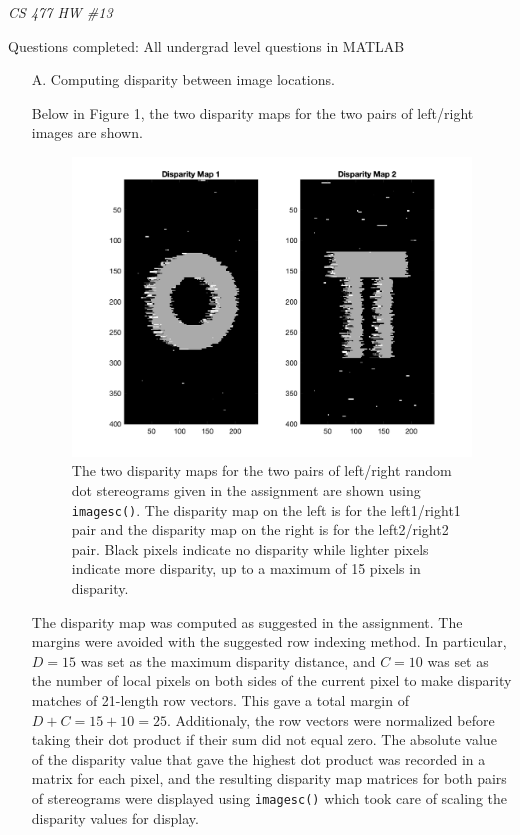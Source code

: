 \documentclass[12pt]{report}
\begin{document}
\centerline{\it CS 477 HW \#13}
\centerline{Questions completed: All undergrad level questions in MATLAB}

\begin{enumerate}

\item[A.] Computing disparity between image locations.

  Below in Figure 1, the two disparity maps for the two pairs of left/right
  images are shown.

  \begin{figure}[H]
    \centering
    \includegraphics[width=\linewidth]{a1.png}
    \caption{The two disparity maps for the two pairs of left/right random dot
      stereograms given in the assignment are shown using
      \texttt{imagesc()}. The disparity map on the left is for the left1/right1
      pair and the disparity map on the right is for the left2/right2
      pair. Black pixels indicate no disparity while lighter pixels indicate
      more disparity, up to a maximum of 15 pixels in disparity.}
  \end{figure}

  The disparity map was computed as suggested in the assignment. The margins
  were avoided with the suggested row indexing method. In particular,
  \( D = 15\) was set as the maximum disparity distance, and \( C = 10\) was set
  as the number of local pixels on both sides of the current pixel to make
  disparity matches of 21-length row vectors. This gave a total margin of
  \( D + C = 15 + 10 = 25\). Additionaly, the row vectors were normalized before
  taking their dot product if their sum did not equal zero. The absolute value
  of the disparity value that gave the highest dot product was recorded in a
  matrix for each pixel, and the resulting disparity map matrices for both pairs
  of stereograms were displayed using \texttt{imagesc()} which took care of
  scaling the disparity values for display.


\end{enumerate}
\end{document}

